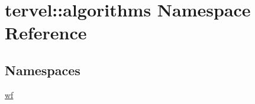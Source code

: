\hypertarget{namespacetervel_1_1algorithms}{}\section{tervel\+:\+:algorithms Namespace Reference}
\label{namespacetervel_1_1algorithms}
\subsection*{Namespaces}
\begin{DoxyCompactItemize}
\item 
 \hyperlink{namespacetervel_1_1algorithms_1_1wf}{wf}
\end{DoxyCompactItemize}
